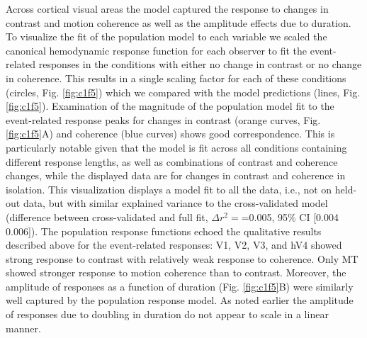 \documentclass{report}
\begin{document}
Across cortical visual areas the model captured the response to changes in contrast and motion coherence as well as the amplitude effects due to duration. To visualize the fit of the population model to each variable we scaled the canonical hemodynamic response function for each observer to fit the event-related responses in the conditions with either no change in contrast or no change in coherence. This results in a single scaling factor for each of these conditions (circles, Fig. \ref{fig:c1f5}) which we compared with the model predictions (lines, Fig. \ref{fig:c1f5}). Examination of the magnitude of the population model fit to the event-related response peaks for changes in contrast (orange curves, Fig. \ref{fig:c1f5}A) and coherence (blue curves) shows good correspondence. This is particularly notable given that the model is fit across all conditions containing different response lengths, as well as combinations of contrast and coherence changes, while the displayed data are for changes in contrast and coherence in isolation. This visualization displays a model fit to all the data, i.e., not on held-out data, but with similar explained variance to the cross-validated model (difference between cross-validated and full fit, $\Delta r^2=$=0.005, 95\% CI [0.004 0.006]). The population response functions echoed the qualitative results described above for the event-related responses: V1, V2, V3, and hV4 showed strong response to contrast with relatively weak response to coherence. Only MT showed stronger response to motion coherence than to contrast. Moreover, the amplitude of responses as a function of duration (Fig. \ref{fig:c1f5}B) were similarly well captured by the population response model. As noted earlier the amplitude of responses due to doubling in duration do not appear to scale in a linear manner.
\end{document}
